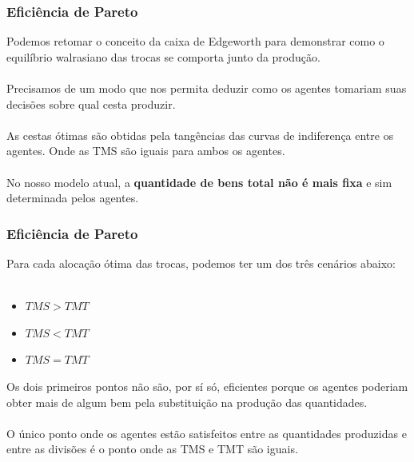 \documentclass{beamer}[10]
\begin{document}
\begin{frame}
	\frametitle{Eficiência de Pareto}

	Podemos retomar o conceito da caixa de Edgeworth para demonstrar como o equilíbrio walrasiano das trocas se comporta junto da produção.
	\\~\\
	Precisamos de um modo que nos permita deduzir como os agentes tomariam suas decisões sobre qual cesta produzir.
	\\~\\
	As cestas ótimas são obtidas pela tangências das curvas de indiferença entre os agentes. Onde as TMS são iguais para ambos os agentes.
	\\~\\
	No nosso modelo atual, a \textbf{quantidade de bens total não é mais fixa} e sim determinada pelos agentes.

\end{frame}

\begin{frame}
	\frametitle{Eficiência de Pareto}

	Para cada alocação ótima das trocas, podemos ter um dos três cenários abaixo:
	\\~\\
	\begin{itemize}
		\item $TMS > TMT$
		\item $TMS < TMT$
		\item $TMS = TMT$
	\end{itemize}

	Os dois primeiros pontos não são, por sí só, eficientes porque os agentes poderiam obter mais de algum bem pela substituição na produção das quantidades.
	\\~\\
	O único ponto onde os agentes estão satisfeitos entre as quantidades produzidas e entre as divisões é o ponto onde as TMS e TMT são iguais.

\end{frame}
\end{document}
